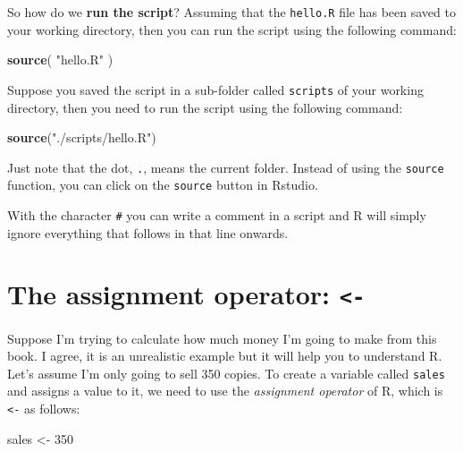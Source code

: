 \documentclass[
  12pt,
  oneside]{book}
\newenvironment{Shaded}{\begin{snugshade}}{\end{snugshade}}
\newcommand{\DecValTok}[1]{\textcolor[rgb]{0.00,0.00,0.81}{#1}}
\newcommand{\FunctionTok}[1]{\textcolor[rgb]{0.13,0.29,0.53}{\textbf{#1}}}
\newcommand{\NormalTok}[1]{#1}
\newcommand{\OtherTok}[1]{\textcolor[rgb]{0.56,0.35,0.01}{#1}}
\newcommand{\StringTok}[1]{\textcolor[rgb]{0.31,0.60,0.02}{#1}}
\begin{document}
So how do we \textbf{run the script}? Assuming that the \texttt{hello.R} file has been saved to your working directory, then you can run the script using the following command:

\begin{Shaded}
\begin{Highlighting}[]
\FunctionTok{source}\NormalTok{( }\StringTok{"hello.R"}\NormalTok{ )}
\end{Highlighting}
\end{Shaded}

Suppose you saved the script in a sub-folder called \texttt{scripts} of your working directory, then you need to run the script using the following command:

\begin{Shaded}
\begin{Highlighting}[]
\FunctionTok{source}\NormalTok{(}\StringTok{"./scripts/hello.R"}\NormalTok{) }
\end{Highlighting}
\end{Shaded}

Just note that the dot, \texttt{.}, means the current folder.
Instead of using the \texttt{source} function, you can click on the \texttt{source} button in Rstudio.

With the character \texttt{\#} you can write a comment in a script and R will simply ignore everything that follows in that line onwards.

\hypertarget{sec:assignmentoper}{%
\section{\texorpdfstring{The assignment operator: \texttt{\textless{}-}}{The assignment operator: \textless-}}\label{sec:assignmentoper}}

Suppose I'm trying to calculate how much money I'm going to make from this book. I agree, it is an unrealistic example but it will help you to understand R.
Let's assume I'm only going to sell 350 copies. To create a variable called \texttt{sales} and assigns a value to it, we need to use the \emph{assignment operator} of R, which is \texttt{\textless{}-} as follows:

\begin{Shaded}
\begin{Highlighting}[]
\NormalTok{sales }\OtherTok{\textless{}{-}} \DecValTok{350}
\end{Highlighting}
\end{Shaded}
\end{document}
